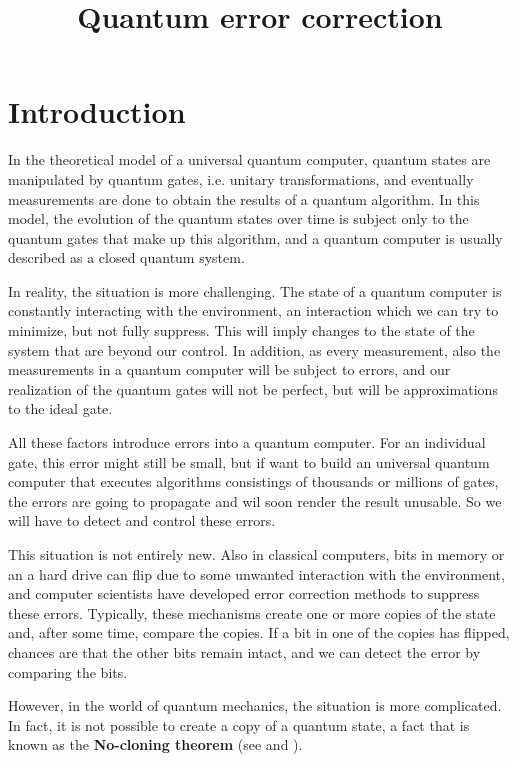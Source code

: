 \documentclass[a4paper, draft]{article}
\title{Quantum error correction}
\theoremstyle{own}
\theoremstyle{remark}
\begin{document}
\maketitle



\section{Introduction}

In the theoretical model of a universal quantum computer, quantum states are manipulated by quantum gates, i.e. unitary transformations, and eventually measurements are done to obtain the results of a quantum algorithm. In this model, the evolution of the quantum states over time is subject only to the quantum gates that make up this algorithm, and a quantum computer is usually described as a closed quantum system.

In reality, the situation is more challenging. The state of a quantum computer is constantly interacting with the environment, an interaction which we can try to minimize, but not fully suppress. This will imply changes to the state of the system that are beyond our control. In addition, as every measurement, also the measurements in a quantum computer will be subject to errors, and our realization of the quantum gates will not be perfect, but will be approximations to the ideal gate.

All these factors introduce errors into a quantum computer. For an individual gate, this error might still be small, but if want to build an universal quantum computer that executes algorithms consistings of thousands or millions of gates, the errors are going to propagate and wil soon render the result unusable. So we will have to detect and control these errors.

This situation is not entirely new. Also in classical computers, bits in memory or an a hard drive can flip due to some unwanted interaction with the environment, and computer scientists have developed error correction methods to suppress these errors. Typically, these mechanisms create one or more copies of the state and, after some time, compare the copies. If a bit in one of the copies has flipped, chances are that the other bits remain intact, and we can detect the error by comparing the bits.

However, in the world of quantum mechanics, the situation is more complicated. In fact, it is not possible to create a copy of a quantum state, a fact that is known as the {\bf No-cloning theorem} (see \cite{Dieks} and \cite{WootersZurek}). 
\end{document}
